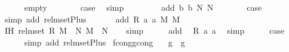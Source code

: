 \begin{isabellebody}
\ \ \ \ \isamarkupfalse%
\ empty\isanewline
\ \ \ \ \isamarkupfalse%
\ \isamarkupfalse%
\ {\isacharquery}{\kern0pt}case\ \isamarkupfalse%
\ simp\isanewline
\ \ \isamarkupfalse%
\isanewline
\ \ \ \ \isamarkupfalse%
\ {\isacharparenleft}{\kern0pt}add\ b\ b{\isacharprime}{\kern0pt}\ N{}\ N{}{\isacharparenright}{\kern0pt}\isanewline
\ \ \ \ \isamarkupfalse%
\ \isamarkupfalse%
\ {\isacharquery}{\kern0pt}case\isanewline
\ \ \ \ \ \ \isamarkupfalse%
\ {\isacharparenleft}{\kern0pt}simp\ add{\isacharcolon}{\kern0pt}\ rel{\isacharunderscore}{\kern0pt}mset{\isacharunderscore}{\kern0pt}Plus{\isacharparenright}{\kern0pt}\isanewline
\ \ \isamarkupfalse%
\isanewline
{}\isamarkupfalse%
\isanewline
\ \ \isamarkupfalse%
\ {\isacharparenleft}{\kern0pt}add\ R\ a\ a{\isacharprime}{\kern0pt}\ M{}\ M{}{\isacharparenright}{\kern0pt}\isanewline
\ \ \isamarkupfalse%
\ \isamarkupfalse%
\ IH{\isacharcolon}{\kern0pt}\ {\isachardoublequoteopen}rel{\isacharunderscore}{\kern0pt}mset\ R\ {\isacharparenleft}{\kern0pt}M{}\ {\isacharplus}{\kern0pt}\ N{\isacharparenright}{\kern0pt}\ {\isacharparenleft}{\kern0pt}M{}\ {\isacharplus}{\kern0pt}\ N{\isacharprime}{\kern0pt}{\isacharparenright}{\kern0pt}{\isachardoublequoteclose}\isanewline
\ \ \isamarkupfalse%
\ simp\isanewline
\ \ \isamarkupfalse%
\ \isamarkupfalse%
\ add\ \isamarkupfalse%
\ {\isachardoublequoteopen}R\ a\ a{\isacharprime}{\kern0pt}{\isachardoublequoteclose}\ \isamarkupfalse%
\ simp\isanewline
\ \ \isamarkupfalse%
\ \isamarkupfalse%
\ {\isacharquery}{\kern0pt}case\isanewline
\ \ \ \ \isamarkupfalse%
\ {\isacharparenleft}{\kern0pt}simp\ add{\isacharcolon}{\kern0pt}\ rel{\isacharunderscore}{\kern0pt}mset{\isacharunderscore}{\kern0pt}Plus{\isacharparenright}{\kern0pt}\isanewline
{}\isamarkupfalse%
%
\endisatagproof
{\isafoldproof}%
%
\isadelimproof
\isanewline
%
\endisadelimproof
\isanewline
\isanewline
{}\isamarkupfalse%
\ f{\isacharunderscore}{\kern0pt}cong{\isacharunderscore}{\kern0pt}gcong{\isacharcolon}{\kern0pt}\isanewline
\ \ \ {\isachardoublequoteopen}g{}\ {\isasymsimeq}\ g{}{\isachardoublequoteclose}\isanewline

\end{isabellebody}
